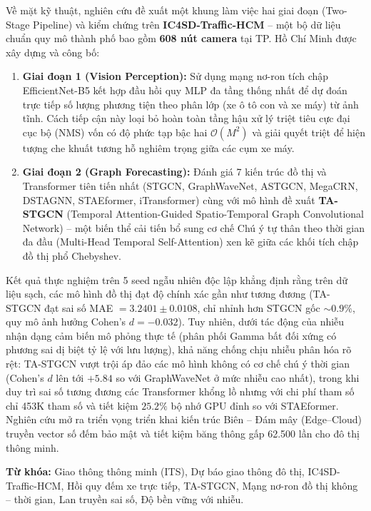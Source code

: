 \documentclass[12pt,a4paper,oneside]{report}
\begin{document}
Về mặt kỹ thuật, nghiên cứu đề xuất một khung làm việc hai giai đoạn (Two-Stage Pipeline) và kiểm chứng trên \textbf{IC4SD-Traffic-HCM} -- một bộ dữ liệu chuẩn quy mô thành phố bao gồm \textbf{608 nút camera} tại TP. Hồ Chí Minh được xây dựng và công bố:
\begin{enumerate}
    \item \textbf{Giai đoạn 1 (Vision Perception):} Sử dụng mạng nơ-ron tích chập EfficientNet-B5 kết hợp đầu hồi quy MLP đa tầng thống nhất để dự đoán trực tiếp số lượng phương tiện theo phân lớp (xe ô tô con và xe máy) từ ảnh tĩnh. Cách tiếp cận này loại bỏ hoàn toàn tầng hậu xử lý triệt tiêu cực đại cục bộ (NMS) vốn có độ phức tạp bậc hai $\mathcal{O}(M^2)$ và giải quyết triệt để hiện tượng che khuất tương hỗ nghiêm trọng giữa các cụm xe máy.
    \item \textbf{Giai đoạn 2 (Graph Forecasting):} Đánh giá 7 kiến trúc đồ thị và Transformer tiên tiến nhất (STGCN, GraphWaveNet, ASTGCN, MegaCRN, DSTAGNN, STAEformer, iTransformer) cùng với mô hình đề xuất \textbf{TA-STGCN} (Temporal Attention-Guided Spatio-Temporal Graph Convolutional Network) -- một biến thể cải tiến bổ sung cơ chế Chú ý tự thân theo thời gian đa đầu (Multi-Head Temporal Self-Attention) xen kẽ giữa các khối tích chập đồ thị phổ Chebyshev.
\end{enumerate}

Kết quả thực nghiệm trên 5 seed ngẫu nhiên độc lập khẳng định rằng trên dữ liệu sạch, các mô hình đồ thị đạt độ chính xác gần như tương đương (TA-STGCN đạt sai số MAE $= 3.2401 \pm 0.0108$, chỉ nhỉnh hơn STGCN gốc $\sim 0.9\%$, quy mô ảnh hưởng Cohen's $d = -0.032$). Tuy nhiên, dưới tác động của nhiễu nhận dạng cảm biến mô phỏng thực tế (phân phối Gamma bất đối xứng có phương sai dị biệt tỷ lệ với lưu lượng), khả năng chống chịu nhiễu phân hóa rõ rệt: TA-STGCN vượt trội áp đảo các mô hình không có cơ chế chú ý thời gian (Cohen's $d$ lên tới $+5.84$ so với GraphWaveNet ở mức nhiễu cao nhất), trong khi duy trì sai số tương đương các Transformer khổng lồ nhưng với chi phí tham số chỉ 453K tham số và tiết kiệm $25.2\%$ bộ nhớ GPU đỉnh so với STAEformer. Nghiên cứu mở ra triển vọng triển khai kiến trúc Biên -- Đám mây (Edge--Cloud) truyền vector số đếm bảo mật và tiết kiệm băng thông gấp 62.500 lần cho đô thị thông minh.

\vspace{0.5cm}
\noindent \textbf{Từ khóa:} Giao thông thông minh (ITS), Dự báo giao thông đô thị, IC4SD-Traffic-HCM, Hồi quy đếm xe trực tiếp, TA-STGCN, Mạng nơ-ron đồ thị không -- thời gian, Lan truyền sai số, Độ bền vững với nhiễu.
\end{document}
